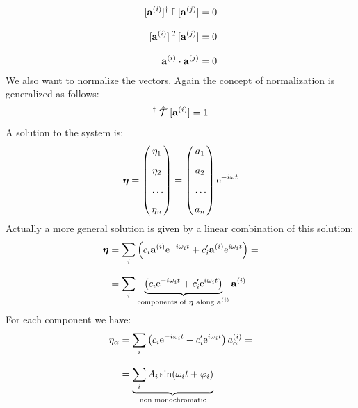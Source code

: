 \begin{equation}
    \begin{split}
        [\vb{a}^{(i)}]^{\dagger}\;\mathbb{I}\;[\vb{a}^{(j)}] &= 0\\[8pt]
        [\vb{a}^{(i)}]^{\;T} [\vb{a}^{(j)}] &= 0 \\[8pt]
        \vb{a}^{(i)}\cdot \vb{a}^{(j)} &= 0
    \end{split}
\end{equation}
We also want to normalize the vectors. Again the concept of normalization is generalized as follows:
\begin{equation}
    [\vec{a}^{(i)}]^{\dagger}\;\hat{\Telegant}\;[\vec{a}^{(i)}] = 1
\end{equation}
A solution to the system is:
\begin{equation}
    \boldsymbol{\eta} = \begin{pmatrix}
        \eta_1\\[8pt]
        \eta_2\\[8pt]
         \,\dots\, \\[8pt]
        \eta_n
    \end{pmatrix}
    =
    \begin{pmatrix}
        a_1\\[8pt]
        a_2\\[8pt]
         \,\dots\, \\[8pt]
        a_n
    \end{pmatrix}\mathrm{e}^{-i\omega t}
\end{equation}
Actually a more general solution is given by a linear combination of this solution:
\begin{equation}
    \begin{split}
        \boldsymbol{\eta} &= \displaystyle\sum_i\left(c_i \vb{a}^{(i)} \mathrm{e}^{-i\omega_i t} + c_i' \vb{a}^{(i)} \mathrm{e}^{i\omega_i t}\right) =\\[8pt]
        &= \displaystyle\sum_i \underbrace{\left(c_i \mathrm{e}^{-i\omega_i t} + c_i' \mathrm{e}^{i\omega_i t}\right)}_{\text{components of $\boldsymbol{\eta}$ along $\vb{a}^{(i)}$}}\vb{a}^{(i)}
    \end{split}
\end{equation}
For each component we have:
\begin{equation}
    \begin{split}
        \eta_{\alpha} &= \displaystyle\sum_i \left(c_i \mathrm{e}^{-i\omega_i t} + c_i' \mathrm{e}^{i\omega_i t}\right)a_{\alpha}^{(i)} =\\[8pt]
        &=  \underbrace{\displaystyle\sum_i A_i \sin(\omega_i t + \varphi_i)}_{\text{non monochromatic}}
    \end{split}
\end{equation}
